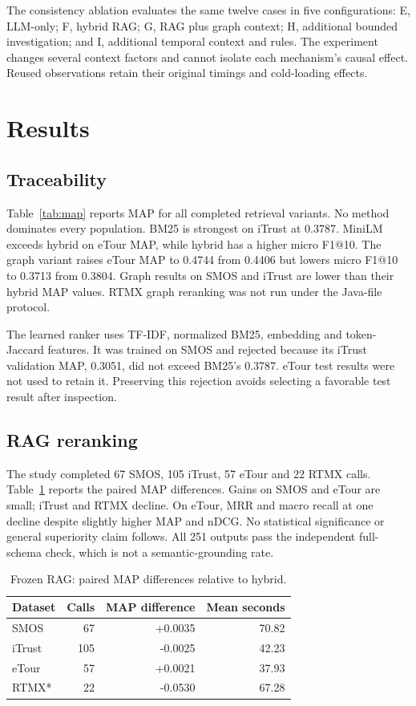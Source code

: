 \documentclass[conference,a4paper]{IEEEtran}
\begin{document}
The consistency ablation evaluates the same twelve cases in five configurations: E, LLM-only; F, hybrid RAG; G, RAG plus graph context; H, additional bounded investigation; and I, additional temporal context and rules. The experiment changes several context factors and cannot isolate each mechanism's causal effect. Reused observations retain their original timings and cold-loading effects.

\section{Results}
\subsection{Traceability}
Table~\ref{tab:map} reports MAP for all completed retrieval variants. No method dominates every population. BM25 is strongest on iTrust at 0.3787. MiniLM exceeds hybrid on eTour MAP, while hybrid has a higher micro F1@10. The graph variant raises eTour MAP to 0.4744 from 0.4406 but lowers micro F1@10 to 0.3713 from 0.3804. Graph results on SMOS and iTrust are lower than their hybrid MAP values. RTMX graph reranking was not run under the Java-file protocol.

The learned ranker uses TF-IDF, normalized BM25, embedding and token-Jaccard features. It was trained on SMOS and rejected because its iTrust validation MAP, 0.3051, did not exceed BM25's 0.3787. eTour test results were not used to retain it. Preserving this rejection avoids selecting a favorable test result after inspection.

\subsection{RAG reranking}
The study completed 67 SMOS, 105 iTrust, 57 eTour and 22 RTMX calls. Table~\ref{tab:rag} reports the paired MAP differences. Gains on SMOS and eTour are small; iTrust and RTMX decline. On eTour, MRR and macro recall at one decline despite slightly higher MAP and nDCG. No statistical significance or general superiority claim follows. All 251 outputs pass the independent full-schema check, which is not a semantic-grounding rate.
\begin{table}[!t]
\centering\footnotesize
\caption{Frozen RAG: paired MAP differences relative to hybrid.}\label{tab:rag}
\begin{tabular}{lrrr}\toprule
Dataset & Calls & MAP difference & Mean seconds \\\midrule
SMOS & 67 & +0.0035 & 70.82 \\
iTrust & 105 & -0.0025 & 42.23 \\
eTour & 57 & +0.0021 & 37.93 \\
RTMX* & 22 & -0.0530 & 67.28 \\
\bottomrule\end{tabular}
\end{table}
\end{document}

